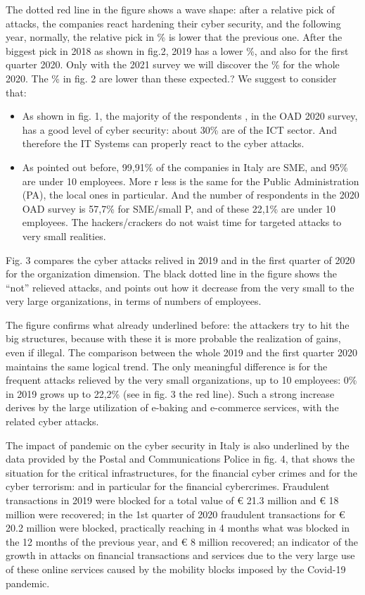 \documentclass{easychair}
\begin{document}

The dotted red line in the figure shows a wave shape: after a relative pick of attacks, the companies react hardening their cyber security, and the following year, normally, 
the relative pick in \% is lower that the previous one. After the biggest pick in 2018 as shown in fig.2,  2019 has a lower \%, and also for the first quarter 2020.
Only with the 2021 survey we will discover the \% for the whole 2020. The \%  in fig. 2 are lower than these expected.? We suggest to consider that:

\begin{itemize}
\item As shown in fig. 1, the majority of the respondents , in the OAD 2020 survey, has a good level of cyber security: about 30\% are of the ICT sector. 
And therefore the IT Systems can properly react to the cyber attacks. 

\item As pointed out before, 99,91\% of the companies in Italy are SME, and 95\% are under 10 employees. More r less is the same for the Public Administration (PA), 
the local ones in particular. And the number of respondents in the 2020 OAD survey is 57,7\% for SME/small P, and of these 22,1\% are under 10 employees. 
The hackers/crackers do not waist time for targeted attacks to very small realities.
\end{itemize}

Fig. 3 compares the cyber attacks relived in 2019 and in the first quarter of 2020 for the organization dimension. The black dotted line in the figure shows 
the “not” relieved attacks, and points out how it decrease from the very small to the very large organizations, in terms of numbers of employees. 


The figure confirms what already underlined before: the attackers try to hit the big structures, because with these it is more probable the realization of gains, even if illegal.
The comparison between the whole 2019 and the first quarter 2020 maintains the same logical trend. The only meaningful difference is for the frequent attacks relieved by the very
small organizations, up to 10 employees: 0\% in 2019 grows up to 22,2\% (see in fig. 3 the red line). Such a strong increase derives by the large utilization of e-baking and 
e-commerce services, with the related cyber attacks.

The impact of pandemic on the cyber security in Italy is also underlined by the data  provided by the Postal and Communications Police in fig. 4, that shows the situation for the
critical infrastructures, for the financial cyber crimes and for the cyber terrorism: and in particular for the financial cybercrimes. Fraudulent transactions in 2019 were blocked
for a total value of € 21.3 million and € 18 million were recovered; in the 1st quarter of 2020 fraudulent transactions for € 20.2 million were blocked, practically 
reaching in 4 months what was blocked in the 12 months of the previous year, and € 8 million recovered; an indicator of the growth in attacks on financial transactions and 
services due to the very large use of these online services caused by the mobility blocks imposed by the Covid-19 pandemic.
\end{document}
